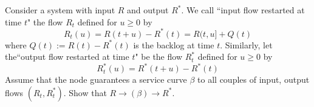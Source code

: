\begin{problem}
 Consider a system with
input $R$ and output $R^*$. We call ``input flow restarted at time
$t$" the flow $R_t$ defined for $u \geq 0$ by
$$
R_t(u)=R(t+u)-R^*(t) = R(t,u]+Q(t)
$$
where $Q(t):=R(t)-R^*(t)$ is the backlog at time $t$. Similarly,
let the``output flow restarted at time $t$" be the flow $R^*_t$
defined for $u \geq 0$ by
$$R^*_t(u)=R^*(t+u)-R^*(t)$$
Assume that the node guarantees a service curve $\beta$ to all
couples of input, output flows $(R_t, R^*_t)$. Show that $R
\rightarrow (\beta) \rightarrow R^*$.
\end{problem}
